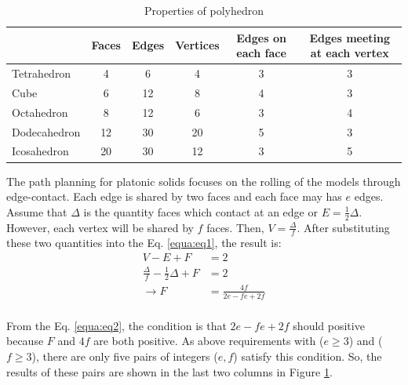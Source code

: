 %
\begin{table}[H]
\centering
\caption{Properties of polyhedron}
\label{tab:tb1}
\begin{tabular}{|l|c|c|c|c|c|}
\hline
             & Faces & Edges & Vertices & Edges on each face & Edges meeting at each vertex \\ \hline
Tetrahedron  & 4     & 6     & 4        & 3                  & 3                            \\ \hline
Cube         & 6     & 12    & 8        & 4                  & 3                            \\ \hline
Octahedron   & 8     & 12    & 6        & 3                  & 4                            \\ \hline
Dodecahedron & 12    & 30    & 20       & 5                  & 3                            \\ \hline
Icosahedron  & 20    & 30    & 12       & 3                  & 5                            \\ \hline
\end{tabular}
\end{table}
%

\noindent The path planning for platonic solids focuses on the rolling of the models through edge-contact. Each edge is shared by two faces and each face may has $e$ edges. Assume that $\Delta $ is the quantity faces which contact at an edge or $E=\frac{1}{2}\Delta $. However, each vertex will be shared by $f$ faces. Then, $V=\frac{\Delta}{f}$. After substituting these two quantities into the Eq. \ref{equa:eq1}, the result is:
%
%
\begin{equation} 
\label{equa:eq2}
\begin{split}
V-E+F &= 2\\
\frac{\Delta}{f} - \frac{1}{2}\Delta + F &= 2\\
\rightarrow F &= \frac{4f}{2e-fe+2f}\\
\end{split}
\end{equation}
%

\noindent From the Eq. \ref{equa:eq2}, the condition is that $2e-fe+2f$ should positive because $F$ and $4f$ are both positive. 
As above requirements with ($e\geq3$) and ($f\geq3$), there are only five pairs of integers ($e,f$) satisfy this condition. 
So, the results of these pairs are shown in the last two columns in Figure \ref{tab:tb1}.\\

